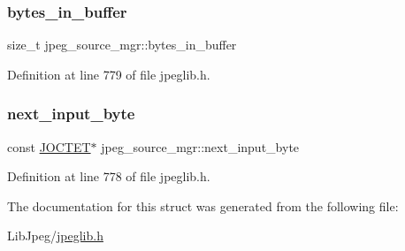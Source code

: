 \subsubsection{\texorpdfstring{bytes\_in\_buffer}{bytes\_in\_buffer}}
{\footnotesize\ttfamily size\+\_\+t jpeg\+\_\+source\+\_\+mgr\+::bytes\+\_\+in\+\_\+buffer}



Definition at line 779 of file jpeglib.\+h.

\mbox{\label{structjpeg__source__mgr_aad884e7f4ba7496ab0f56c942c7585c1}} 
\subsubsection{\texorpdfstring{next\_input\_byte}{next\_input\_byte}}
{\footnotesize\ttfamily const \mbox{\hyperlink{jmorecfg_8h_a356ad249f20e691b520da439f92cccbc}{J\+O\+C\+T\+ET}}$\ast$ jpeg\+\_\+source\+\_\+mgr\+::next\+\_\+input\+\_\+byte}



Definition at line 778 of file jpeglib.\+h.



The documentation for this struct was generated from the following file\+:\begin{DoxyCompactItemize}
\item 
Lib\+Jpeg/\mbox{\hyperlink{jpeglib_8h}{jpeglib.\+h}}\end{DoxyCompactItemize}
